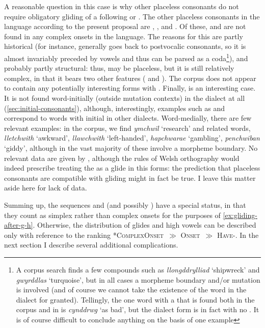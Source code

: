 A reasonable question in this case is why other placeless consonants do not require obligatory gliding of a following \ipa{[u]} or \ipa{[i]}. The other placeless consonants in the language according to the present proposal are \ipa{[ð]}, \ipa{[χ]}, and \ipa{[ɬ]}. Of these, \ipa{[ð]} and \ipa{[ɬ]} are not found in any complex onsets in the language. The reasons for this are partly historical (for instance, \ipa{[ð]} generally goes back to postvocalic consonants, so it is almost invariably preceded by vowels and thus can be parsed as a coda\footnote{A corpus search finds a few compounds such as \emph{llongddrylliad} `shipwreck' and \emph{gwyrddlas} `turquoise', but in all cases a morpheme boundary and/or mutation is involved (and of course we cannot take the existence of the word in the dialect for granted). Tellingly, the one word with a \ipa{[CðC]} that is found both in the corpus and in \citet{awbery86:_pembr_welsh} is \emph{cynddrwg} `as bad', but the dialect form is in fact \ipa{[ˈkindruɡ]} with no \ipa{[ð]}. It is of course difficult to conclude anything on the basis of one example}), and probably partly structural: thus, \ipa{[ɬ]} may be placeless, but it is still relatively complex, in that it bears two other features ( and ). The corpus does not appear to contain any potentially interesting forms with \ipa{[ɬ]}. Finally, \ipa{[χ]} is an interesting case. It is not found word-initially (outside mutation contexts) in the dialect at all (\cref{sec:initial-consonants}), although, interestingly, examples such as \ipa{[ˈhweːχ]} and \ipa{[ˈhweːru]} correspond to words with initial \ipa{[χw]} in other dialects. Word-medially, there are few relevant examples: in the corpus, we find \emph{ymchwil} `research' and related words, \emph{lletchwith} `awkward', \emph{llawchwith} `left-handed', \emph{hapchwarae} `gambling', \emph{penchwiban} `giddy', although in the vast majority of these involve a morpheme boundary. No relevant data are given by \citet{awbery86:_pembr_welsh}, although the rules of Welsh orthography would indeed prescribe treating the \ipa{[w]} as a glide in this forms: the prediction that placeless consonants are compatible with gliding might in fact be true. I leave this matter aside here for lack of data.

Summing up, the sequences \ipa{[ɡw]} and \ipa{[hw]} (and possibly \ipa{[χw]}) have a special status, in that they count as simplex rather than complex onsets for the purposes of \ref{ex:gliding-after-g-h}. Otherwise, the distribution of glides and high vowels can be described only with reference to the ranking *\textsc{ComplexOnset}~$\gg$ \textsc{Onset}~$\gg$ \textsc{Have}-\mo[V]. In the next section I describe several additional complications.

